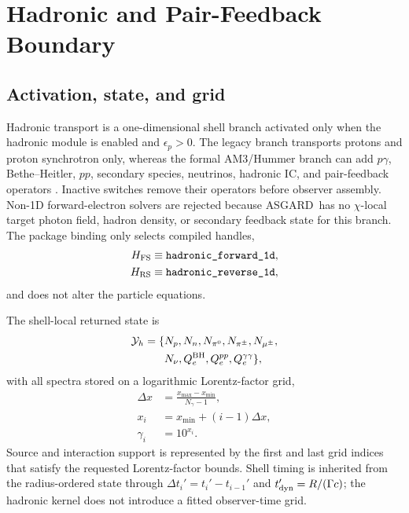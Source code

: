 \documentclass[twocolumn]{aastex702}
\newcommand{\asgard}{\textsc{ASGARD}}
\begin{document}
\section{Hadronic and Pair-Feedback Boundary} \label{sec:hadronic}

\subsection{Activation, state, and grid}

Hadronic transport is a one-dimensional shell branch activated only when the
hadronic module is enabled and \(\epsilon_p>0\).  The legacy branch transports
protons and proton synchrotron only, whereas the formal AM3/Hummer branch can add
\(p\gamma\), Bethe--Heitler, \(pp\), secondary species, neutrinos, hadronic IC,
and pair-feedback operators
\citep{Murase2007,Hummer2010,KelnerAharonian2008,Chodorowski1992,GouldSchreder1967,IceCube2017GRBNeutrinos,Sahu2022GRB190829AHadronic,Sahu2024GRB221009AHadronic}.
Inactive switches remove their operators before observer assembly.  Non-1D
forward-electron solvers are rejected because \asgard\ has no \(\chi\)-local
target photon field, hadron density, or secondary feedback state for this branch.
The package binding only selects compiled handles,
\begin{equation}
\begin{aligned}
H_{\rm FS}&\equiv\texttt{hadronic\_forward\_1d},\\
H_{\rm RS}&\equiv\texttt{hadronic\_reverse\_1d},
\end{aligned}
\end{equation}
and does not alter the particle equations.

The shell-local returned state is
\begin{equation}
\begin{aligned}
{\cal Y}_h=\{&
N_p,N_n,N_{\pi^0},N_{\pi^\pm},N_{\mu^\pm},\\
&N_\nu,Q_e^{\rm BH},Q_e^{pp},Q_e^{\gamma\gamma}\},
\end{aligned}
\end{equation}
with all spectra stored on a logarithmic Lorentz-factor grid,
\begin{equation}
\begin{aligned}
\Delta x&=\frac{x_{\max}-x_{\min}}{N_\gamma-1},\\
x_i&=x_{\min}+(i-1)\Delta x,\\
\gamma_i&=10^{x_i}.
\end{aligned}
\end{equation}
Source and interaction support is represented by the first and last grid indices
that satisfy the requested Lorentz-factor bounds.  Shell timing is inherited from
the radius-ordered state through \(\Delta t_i'=t_i'-t_{i-1}'\) and
\(t'_{\rm dyn}=R/(\Gamma c)\); the hadronic kernel does not introduce a fitted
observer-time grid.
\end{document}
